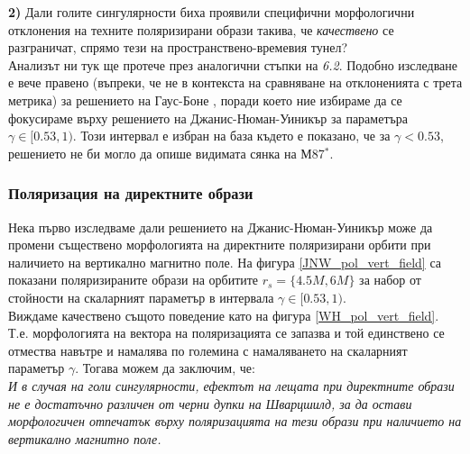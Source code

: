\textbf{2)} Дали голите сингулярности биха проявили специфични морфологични отклонения на техните поляризирани образи такива, че \emph{качествено} се разграничат, спрямо тези на пространствено-времевия тунел?\\

Анализът ни тук ще протече през аналогични стъпки на \emph{6.2}. Подобно изследване е вече правено (въпреки, че не в контекста на сравняване на отклоненията с трета метрика) за решението на Гаус-Боне \cite{Qin2021}, поради което ние избираме да се фокусираме върху решението на Джанис-Нюман-Уиникър за параметъра $\gamma \in [0.53, 1)$. Този интервал е избран на база \cite{Kocherlakota2021}  където е показано, че за $\gamma < 0.53$, решението не би могло да опише видимата сянка на М87$^*$. 

\subsubsection{Поляризация на директните образи}

Нека първо изследваме дали решението на Джанис-Нюман-Уиникър може да промени съществено морфологията на директните поляризирани орбити при наличието на вертикално магнитно поле. На фигура \ref{JNW_pol_vert_field} са показани поляризираните образи на орбитите $r_s = \{4.5M,6M\}$ за набор от стойности на скаларният параметър в интервала $\gamma\in[0.53,1)$.\\

Виждаме качествено същото поведение като на фигура \ref{WH_pol_vert_field}. Т.е. морфологията на вектора на поляризацията се запазва и той единствено се отмества навътре и намалява по големина с намаляването на скаларният параметър $\gamma$. Тогава можем да заключим, че:\\

\emph{И в случая на голи сингулярности, ефектът на лещата при директните образи не е достатъчно различен от черни дупки на Шварцшилд, за да остави морфологичен отпечатък върху поляризацията на тези образи при наличието на вертикално магнитно поле.}


